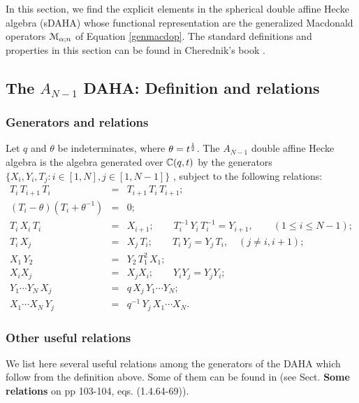 
In this section, we find the explicit elements in the spherical double affine Hecke algebra (sDAHA) whose functional representation are the generalized Macdonald operators $\mathcal M_{{\alpha};n}$ of Equation \eqref{genmacdop}. The standard definitions and properties in this section can be found in Cherednik's book
\cite{Cheredbook}.

\subsection{The $A_{N-1}$ DAHA: Definition and relations}

\subsubsection{Generators and relations}\label{defdahasec}
Let $q$ and $\theta$ be indeterminates, where $\theta=t^{\frac12}$. 
The $A_{N-1}$ double affine Hecke algebra is the algebra generated 
over ${\mathbb C}(q,t)$ by the generators $\{X_i,Y_i,T_j: i\in [1,N], j\in [1,N-1]\}$ ,
subject to the following relations:
\begin{eqnarray}
 T_i\, T_{i+1}\,T_i&=&T_{i+1}\, T_i\,T_{i+1}; \label{braid}\\
  (T_i-\theta)(T_i+\theta^{-1})&=&0; \nonumber \\
 T_i\, X_i\,T_i&=&X_{i+1}; \qquad T_i^{-1}\,Y_i\,T_i^{-1}=Y_{i+1},\qquad (1\leq i\leq N-1);\label{TY}\\
 T_i\, X_j&=&X_j\, T_i; \qquad
  T_i\, Y_j =Y_j\, T_i ,\quad (j\neq i,i+1);\nonumber\\
 X_1\,Y_{2}&=&Y_2\,T_1^{2}\,X_1;\nonumber \\
X_i X_j &=& X_j X_i;\qquad Y_i Y_j = Y_j Y_i; \nonumber \\ 
{Y_1\cdots Y_N}\, X_j&=&q \, X_j\, {Y_1\cdots Y_N};\nonumber \\
 {X_1\cdots X_N}\, Y_j&=&q^{-1}\, Y_j\, {X_1\cdots X_N} .\label{prodXy}
\end{eqnarray}

\subsubsection{Other useful relations}
We list here several useful relations among the generators of the DAHA which follow from the definition above.
Some of them can be found in \cite{Cheredbook} (see Sect. {\bf Some relations} on pp 103-104, eqs. (1.4.64-69)).

